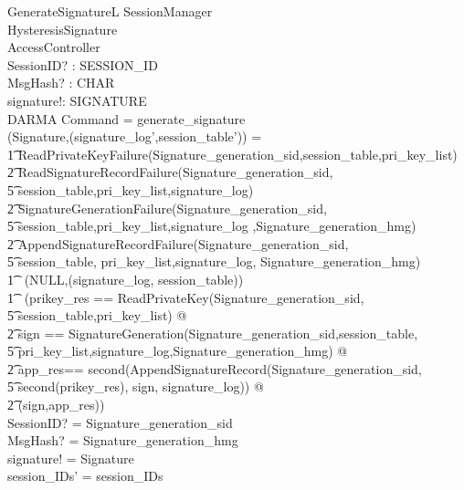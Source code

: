 \documentclass[a4paper,pdftex]{article}
\begin{document}
\begin{schema}{GenerateSignatureL}
  \Delta SessionManager         \\
  \Delta HysteresisSignature    \\
  \Xi AccessController          \\
  SessionID? : SESSION\_ID      \\
  MsgHash? : \seq CHAR          \\
  signature!: SIGNATURE         \\
  DARMA
  \where
  Command = generate\_signature \\

  (Signature,(signature\_log',session\_table')) = \\
\t1 \IF ReadPrivateKeyFailure(Signature\_generation\_sid,session\_table,pri\_key\_list)\\
\t2  \lor ReadSignatureRecordFailure(Signature\_generation\_sid, \\
\t5        session\_table,pri\_key\_list,signature\_log) \\
\t2  \lor SignatureGenerationFailure(Signature\_generation\_sid,\\
\t5          session\_table,pri\_key\_list,signature\_log ,Signature\_generation\_hmg) \\
\t2  \lor AppendSignatureRecordFailure(Signature\_generation\_sid, \\
\t5         session\_table, pri\_key\_list,signature\_log, Signature\_generation\_hmg) \\
\t1 \THEN ~(NULL,(signature\_log, session\_table)) \\
\t1 \ELSE ~(\LET prikey\_res == ReadPrivateKey(Signature\_generation\_sid, \\
\t5                                           session\_table,pri\_key\_list) @ \\
\t2       \LET sign    == SignatureGeneration(Signature\_generation\_sid,session\_table,\\
\t5                             pri\_key\_list,signature\_log,Signature\_generation\_hmg) @\\
\t2       \LET app\_res== second(AppendSignatureRecord(Signature\_generation\_sid, \\
\t5                                  second(prikey\_res), sign, signature\_log)) @ \\
\t2       (sign,app\_res)) \\
  SessionID? = Signature\_generation\_sid \\
  MsgHash? = Signature\_generation\_hmg \\
  signature! = Signature \\
  session\_IDs' = session\_IDs
\end{schema}
\end{document}
